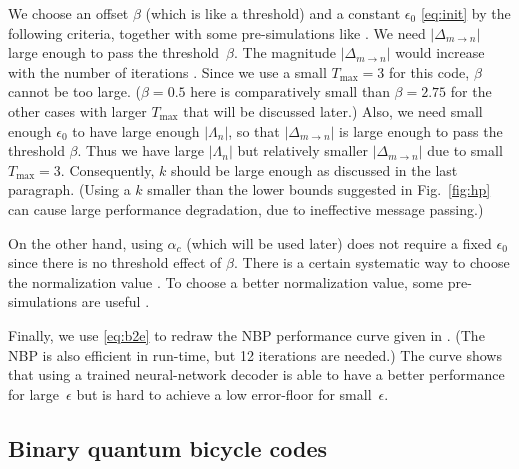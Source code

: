 \documentclass{ieeeaccess}
\theoremstyle{definition}		%
\begin{document}
We choose an offset $\beta$ (which is like a threshold) and a constant $\epsilon_0$ \eqref{eq:init} 
by the following criteria, together with some pre-simulations like \cite[Fig.~11]{KL20}. 
%
We need $|\Delta_{m\to n}|$ large enough to pass the threshold~$\beta$.
The magnitude $|\Delta_{m\to n}|$ would increase with the number of iterations \cite{Gal63}.
Since we use a small ${T_{\max}=3}$ for this code, $\beta$ cannot be too large. 
(${\beta=0.5}$ here is comparatively small than ${\beta=2.75}$ for the other cases with larger $T_{\max}$ that will be discussed later.) 
Also, we need small enough $\epsilon_0$ to have large enough $|\Lambda_n|$, so that $|\Delta_{m\to n}|$ is large enough to pass the threshold $\beta$. 
Thus we have large $|\Lambda_n|$ but relatively smaller $|\Delta_{m\to n}|$ due to small ${T_{\max}=3}$.
Consequently, $k$ should be large enough as discussed in the last paragraph. %
(Using a $k$ smaller than the lower bounds suggested in Fig.~\ref{fig:hp} can cause large performance degradation, due to ineffective message passing.)

On the other hand, using $\alpha_c$ (which will be used later) does not require a fixed $\epsilon_0$ since there is no threshold effect of $\beta$.
There is a certain systematic way to choose the normalization value \cite[Sec.~III-B and Fig.~3]{KL21}.
To choose a better normalization value, some pre-simulations are useful \cite[Fig.~9]{KL20}.





Finally, we use \eqref{eq:b2e} to redraw the NBP performance curve given in \cite{LP19}. (The NBP is also efficient in run-time, but 12 iterations are needed.) 
The curve shows that using a trained neural-network decoder is able to have a better performance for large~$\epsilon$ but is hard to achieve a low error-floor for small~$\epsilon$.




\subsection{Binary quantum bicycle codes}
\end{document}
